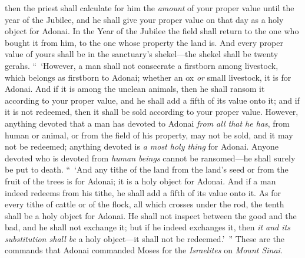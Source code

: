 \begin{biblechapter}
\verse then the priest shall calculate for him the \textit{amount} of your proper value until the year of the Jubilee, and he shall give your proper value on that day as a holy object for Adonai.
\verse In the Year of the Jubilee the field shall return to the one who bought it from him, to the one whose property the land is.
\verse And every proper value of yours shall be in the sanctuary’s shekel—the shekel shall be twenty gerahs.
\verse “ ‘However, a man shall not consecrate a firstborn among livestock, which belongs as firstborn to Adonai; whether an ox \textit{or} small livestock, it is for Adonai.
\verse And if it is among the unclean animals, then he shall ransom it according to your proper value, and he shall add a fifth of its value onto it; and if it is not redeemed, then it shall be sold according to your proper value.
\verse However, anything devoted that a man has devoted to Adonai \textit{from all that he has}, from human or animal, or from the field of his property, may not be sold, and it may not be redeemed; anything devoted is \textit{a most holy thing} for Adonai.
\verse Anyone devoted who is devoted from \textit{human beings} cannot be ransomed—he shall surely be put to death.
\verse “ ‘And any tithe of the land from the land’s seed or from the fruit of the trees is for Adonai; it is a holy object for Adonai.
\verse And if a man indeed redeems from his tithe, he shall add a fifth of its value onto it.
\verse As for every tithe of cattle or of the flock, all which crosses under the rod, the tenth shall be a holy object for Adonai.
\verse He shall not inspect between the good and the bad, and he shall not exchange it; but if he indeed exchanges it, then \textit{it and its substitution shall be} a holy object—it shall not be redeemed.’ ”
\verse These are the commands that Adonai commanded Moses for the \textit{Israelites} on \textit{Mount Sinai}.
\end{biblechapter}

